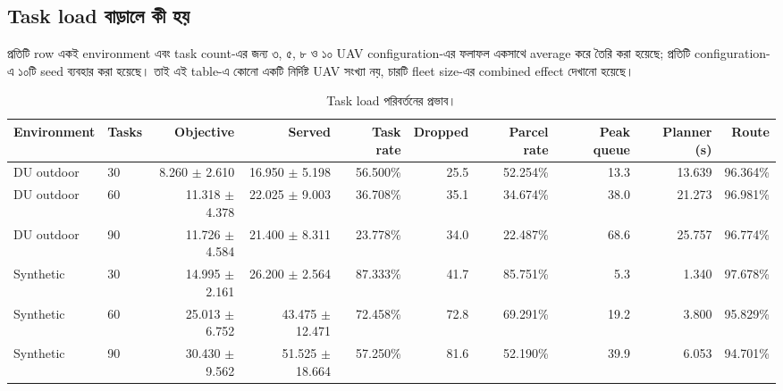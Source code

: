 \documentclass[10pt,a4paper]{article}
\begin{document}
\subsection{Task load বাড়ালে কী হয়}

প্রতিটি row একই environment এবং task count-এর জন্য ৩, ৫, ৮ ও ১০ UAV configuration-এর ফলাফল একসাথে average করে তৈরি করা হয়েছে; প্রতিটি configuration-এ ১০টি seed ব্যবহার করা হয়েছে। তাই এই table-এ কোনো একটি নির্দিষ্ট UAV সংখ্যা নয়, চারটি fleet size-এর combined effect দেখানো হয়েছে।

\begin{table}[htbp]
\centering
\caption{Task load পরিবর্তনের প্রভাব।}
\label{tab:task-effect-bn}
\scriptsize
{}
\begin{tabular}{@{}llrrrrrrrr@{}}
\toprule
Environment & Tasks & Objective & Served & Task rate & Dropped & Parcel rate & Peak queue & Planner (s) & Route \\
\midrule
DU outdoor & 30 & 8.260 $\pm$ 2.610 & 16.950 $\pm$ 5.198 & 56.500\% & 25.5 & 52.254\% & 13.3 & 13.639 & 96.364\% \\
DU outdoor & 60 & 11.318 $\pm$ 4.378 & 22.025 $\pm$ 9.003 & 36.708\% & 35.1 & 34.674\% & 38.0 & 21.273 & 96.981\% \\
DU outdoor & 90 & 11.726 $\pm$ 4.584 & 21.400 $\pm$ 8.311 & 23.778\% & 34.0 & 22.487\% & 68.6 & 25.757 & 96.774\% \\
Synthetic & 30 & 14.995 $\pm$ 2.161 & 26.200 $\pm$ 2.564 & 87.333\% & 41.7 & 85.751\% & 5.3 & 1.340 & 97.678\% \\
Synthetic & 60 & 25.013 $\pm$ 6.752 & 43.475 $\pm$ 12.471 & 72.458\% & 72.8 & 69.291\% & 19.2 & 3.800 & 95.829\% \\
Synthetic & 90 & 30.430 $\pm$ 9.562 & 51.525 $\pm$ 18.664 & 57.250\% & 81.6 & 52.190\% & 39.9 & 6.053 & 94.701\% \\
\bottomrule
\end{tabular}
\end{table}
\end{document}

